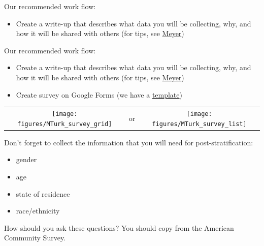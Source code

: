 \documentclass[aspectratio=169]{beamer}
\begin{document}
\begin{frame}

Our recommended work flow:
\begin{itemize}
\item Create a write-up that describes what data you will be collecting, why, and how it will be shared with others (for tips, see \href{https://doi.org/10.1177/2515245917747656}{Meyer})
\end{itemize}

\end{frame}
\begin{frame}

Our recommended work flow:
\begin{itemize}
\item Create a write-up that describes what data you will be collecting, why, and how it will be shared with others (for tips, see \href{https://doi.org/10.1177/2515245917747656}{Meyer})
\item Create survey on Google Forms (we have a \href{https://github.com/compsocialscience/summer-institute/blob/master/2019/materials/day4-surveys/activity/2019-06-13_mturk_google_survey.pdf}{template})
\end{itemize}

\end{frame}
\begin{frame}

\begin{center}
\begin{tabular}{ccc}
\texttt{[image: figures/MTurk\_survey\_grid]} & \phantom{12} \LARGE{or} \phantom{12}  & \texttt{[image: figures/MTurk\_survey\_list]}
\end{tabular}
\end{center}

\end{frame}
\begin{frame}

Don't forget to collect the information that you will need for post-stratification: \pause
\begin{itemize}
\item gender
\item age
\item state of residence
\item race/ethnicity
\end{itemize}

How should you ask these questions?  \pause You should copy from the American Community Survey.

\end{frame}
\end{document}
